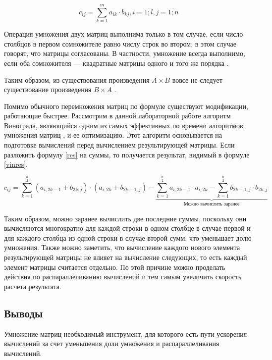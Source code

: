 \documentclass[a4paper,12pt]{article}
\begin{document}
\begin{equation}\label{res}
    c_{ij} = \sum_{k=1}^m a_{ik} \cdot b_{kj}, i = \overline{1;l}, j = \overline{1;n}
\end{equation}

Операция умножения двух матриц выполнима только в том случае, если число столбцов в
первом сомножителе равно числу строк во втором; в этом случае говорят, что матрицы
согласованы. В частности, умножение всегда выполнимо, если оба сомножителя —
квадратные матрицы одного и того же порядка \cite{litr}.

Таким образом, из существования произведения $A \times B$ вовсе не следует
существование произведения $B \times A$ \cite{litr}.

Помимо обычного перемножения матриц по формуле существуют модификации, работающие
быстрее. Рассмотрим в данной лабораторной работе алгоритм Винограда, являющийся одним
из самых эффективных по времени алгоритмов умножения матриц \cite{haskell},
и ее оптимизацию. Этот алгоритм основывается на подготовке вычислений перед вычислением
результирующей матрицы. Если разложить формулу \ref{res} на суммы, то получается
результат, видимый в формуле \ref{vinres}.

\begin{equation}\label{vinres}
    c_{ij} =
    \sum_{k=1}^{\frac{n}{2}} (a_{i,2k-1} + b_{2k,j}) \cdot (a_{i,2k} + b_{2k-1,j}) -
    \underbrace{\sum_{k=1}^{\frac{n}{2}} a_{i,2k-1} \cdot a_{i,2k} -
    \sum_{k=1}^{\frac{n}{2}} b_{2k-1,j} \cdot b_{2k,j}}_\text{Можно вычислить заранее}
\end{equation}

Таким образом, можно заранее вычислить две последние суммы, поскольку они вычисляются
многократно для каждой строки в одном столбце в случае первой и для каждого столбца
из одной строки в случае второй сумм, что уменьшает долю умножения\cite{haskell}. Также
можно заметить, что вычисление каждого нового элемента результирующей матрицы не
влияет на вычисление следующих, то есть каждый элемент матрицы считается отдельно.
По этой причине можно проделать действия по распараллеливанию вычислений и тем самым
увеличить скорость расчета результата.

\subsection{Выводы}

Умножение матриц необходимый инструмент, для которого есть пути ускорения вычислений
за счет уменьшения доли умножения и распараллеливания вычислений.
\end{document}
